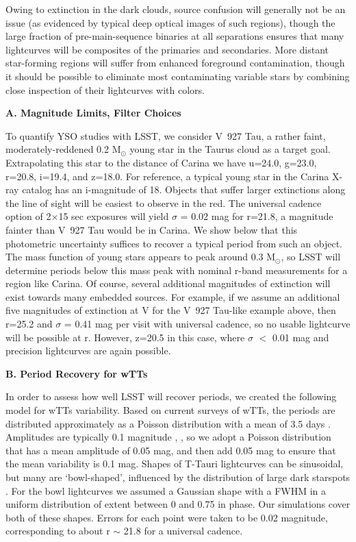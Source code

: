Owing to extinction in the dark clouds,
source confusion will generally not be an issue (as evidenced by typical
deep optical images of such regions), though the large fraction
of pre-main-sequence binaries at all separations ensures that many
lightcurves will be composites of the primaries and secondaries. 
More distant star-forming regions will suffer from enhanced foreground 
contamination, though it should be possible to eliminate most contaminating
variable stars by combining close inspection of their lightcurves with
colors.


\bf{A. Magnitude Limits, Filter Choices}

To quantify YSO studies with LSST, we consider V~927 Tau, 
a rather faint, moderately-reddened 0.2 M$_\odot$ young star in the Taurus cloud
as a target goal. Extrapolating this star
to the distance of Carina we have u=24.0, g=23.0, r=20.8, i=19.4, and z=18.0. For reference,
a typical young star in the Carina X-ray catalog has an i-magnitude of 18.
Objects that suffer larger extinctions along the line of sight will
be easiest to observe in the red. The universal cadence option of 2$\times$15 sec
exposures will yield $\sigma$ = 0.02 mag for r=21.8, a magnitude fainter than
V~927 Tau would be in Carina. We show below that this photometric uncertainty 
suffices to recover a typical period from such an object. The mass function
of young stars appears to peak around 0.3 M$_\odot$, so LSST will 
determine periods below this mass peak with nominal r-band measurements
for a region like Carina. Of course, several additional magnitudes of extinction will
exist towards many embedded sources. For example, if we assume an additional five magnitudes
of extinction at V for the V~927 Tau-like example above,
then r=25.2 and $\sigma$ = 0.41 mag per visit with universal cadence,
so no usable lightcurve will be possible at r. 
However, z=20.5 in this case, where $\sigma$ $<$ 0.01 mag and precision
lightcurves are again possible. 

\bf{B. Period Recovery for wTTs}

In order to assess how well LSST will recover periods, we created the following
model for wTTs variability.  Based on current surveys of wTTs, the periods are
distributed approximately as a Poisson distribution with a mean of 3.5 days
\citep[Affer et al. (2013)]{Affer13}. 
Amplitudes are typically 0.1 magnitude \citep[(Grankin et al. 2008)]{ROTOR},
, so we adopt a Poisson distribution 
that has a mean amplitude of 0.05 mag, and then add 0.05 mag to ensure that
the mean variability is 0.1 mag. Shapes of T-Tauri lightcurves can be sinusoidal,
but many are `bowl-shaped', influenced by the distribution of large dark starspots
\citep[(Alencar et al. 2010)]{CoRoT}.
For the bowl lightcurves we assumed a Gaussian shape with a FWHM in a uniform
distribution of extent between 0 and 0.75 in phase.
Our simulations cover both of these shapes.
Errors for each point were taken to be 0.02 magnitude, corresponding to
about r $\sim$ 21.8 for a universal cadence. 

